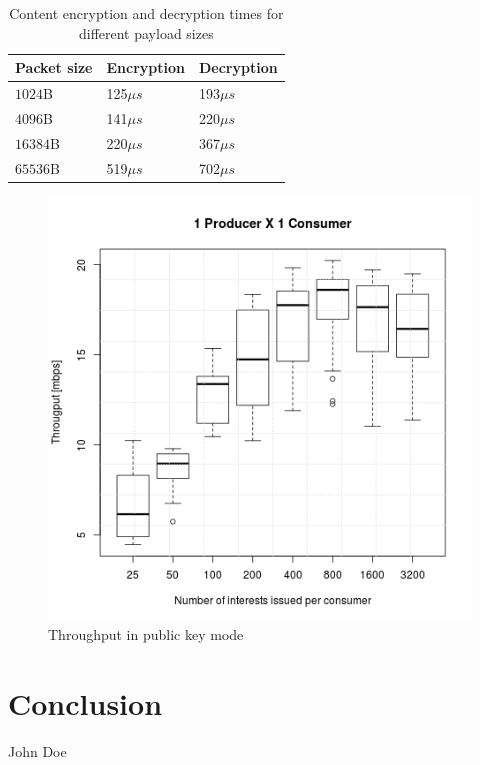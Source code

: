 \documentclass[conference,letterpaper,10pt]{IEEEtran}
\begin{document}
\begin{table}[!h]
\centering
\caption{Content encryption and decryption times for different payload sizes}
\label{my-label}
\begin{tabular}{|l|l|l|}
\hline
Packet size        & Encryption & Decryption \\ \hline
$1024$B & 125$\mu s$        & 193$\mu s$        \\ \hline
$4096$B & 141$\mu s$        & 220$\mu s$        \\ \hline
$16384$B & 220$\mu s$        & 367$\mu s$        \\ \hline
$65536$B & 519$\mu s$        & 702$\mu s$        \\ \hline
\end{tabular}
\end{table}

\begin{figure}[!ht]
\centering
\includegraphics[width=\columnwidth]{throughput_pk_1x1}
\caption{Throughput in public key mode}
\label{throughput1x1}
\end{figure}

\section{Conclusion}\label{conclusion}


\ifCLASSOPTIONcaptionsoff
  \newpage
\fi

\tiny



\begin{IEEEbiography}{John Doe}
\blindtext
\end{IEEEbiography}
\end{document}
